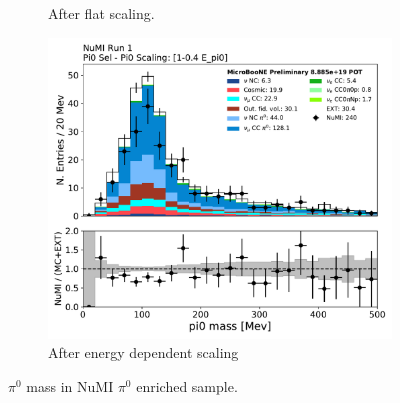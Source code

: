 \begin{figure}[H]
\begin{center}
\begin{subfigure}[b]{0.29\textwidth}
    \caption{\label{fig:pi0NuMI:flatscale} After flat scaling.}
    \end{subfigure}
    \begin{subfigure}[b]{0.29\textwidth}
    \centering
    \includegraphics[width=1.00\textwidth]{Sidebands/Figures/NuMI/Pi0/pi0_mass_Y_ScaleE.pdf}
    \caption{\label{fig:pi0NuMI:Escale} After energy dependent scaling}
    \end{subfigure}
\caption{\label{fig:pi0NuMI} $\pi^0$ mass in NuMI $\pi^0$ enriched sample. }
\end{center}
\end{figure}







